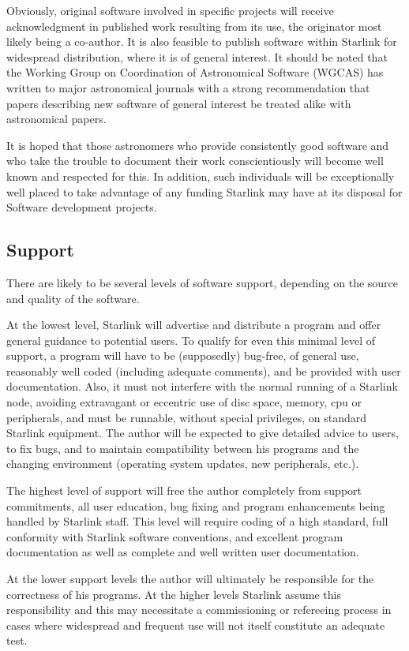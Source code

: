 Obviously, original software involved in specific projects will receive
acknowledgment in published work resulting from its use, the originator most
likely being a co-author.
It is also feasible to publish software within Starlink for widespread
distribution, where it is of general interest.
It should be noted that the Working Group on Coordination of Astronomical
Software (WGCAS) has written to major astronomical journals with a strong
recommendation that papers describing new software of general interest be
treated alike with astronomical papers.

It is hoped that those astronomers who provide consistently good software and
who take the trouble to document their work conscientiously will become well
known and respected for this.
In addition, such individuals will be exceptionally well placed to take
advantage of any funding Starlink may have at its disposal for Software
development projects.
\subsection {Support}
There are likely to be several levels of software support, depending on the
source and quality of the software.

At the lowest level, Starlink will advertise and distribute a program and offer
general guidance to potential users.
To qualify for even this minimal level of support, a program will have to be
(supposedly) bug-free, of general use, reasonably well coded (including adequate
comments), and be provided with user documentation.
Also, it must not interfere with the normal running of a Starlink node, avoiding
extravagant or eccentric use of disc space, memory, cpu or peripherals, and must
be runnable, without special privileges, on standard Starlink equipment.
The author will be expected to give detailed advice to users, to fix bugs, and
to maintain compatibility between his programs and the changing environment
(operating system updates, new peripherals, etc.).

The highest level of support will free the author completely from support
commitments, all user education, bug fixing and program enhancements being
handled by Starlink staff.
This level will require coding of a high standard, full conformity with Starlink
software conventions, and excellent program documentation as well as complete
and well written user documentation.

At the lower support levels the author will ultimately be responsible for the
correctness of his programs.
At the higher levels Starlink assume this responsibility and this may
necessitate a commissioning or refereeing process in cases where widespread and
frequent use will not itself constitute an adequate test.
